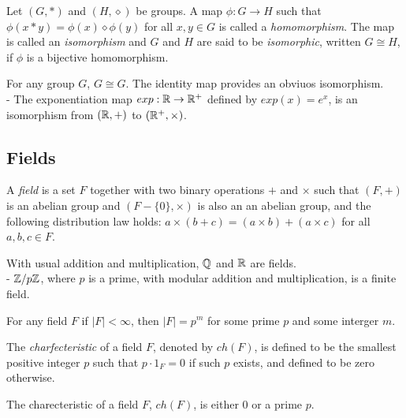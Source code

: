 \begin{definition}
  Let $(G,\ast)$ and $(H,\diamond)$ be groups. A map $\phi:G\rightarrow H$ such that
  $\phi(x\ast y)=\phi(x)\diamond\phi(y)$ for all $x,y\in G$ is called a \textit{homomorphism}.
  The map is called an \textit{isomorphism} and $G$ and $H$ are said to be \textit{isomorphic},
  written $G\cong H$, if $\phi$ is a bijective homomorphism. \cite{dummit}
\end{definition}

\begin{ex}
  For any group $G$, $G\cong G$. The identity map provides an obviuos isomorphism.\\
  - The exponentiation map $exp:\mathbb{R}\rightarrow \mathbb{R}^+$ defined by $exp(x)=e^x$, is an isomorphism
  from $(\mathbb{R},+)$ to $(\mathbb{R}^+,\times)$.
\end{ex}

\subsection{Fields}

\begin{definition}
  A \textit{field} is a set $F$ together with two binary operations $+$ and $\times$ such that
  $(F,+)$ is an abelian group and $(F-\{0\},\times)$ is also an an abelian group, and the
  following distribution law holds: $a\times(b+c)=(a\times b)+(a\times c)$ for all $a,b,c\in F$.
  \cite{dummit}
\end{definition}

\begin{ex}
  With usual addition and multiplication, $\mathbb{Q}$ and $\mathbb{R}$ are fields.\\
   - $\mathbb{Z}/p\mathbb{Z}$, where $p$ is a prime, with modular addition and multiplication, is a finite
  field.
\end{ex}

\begin{remark}
  For any field $F$ if $\vert F\vert <\infty$, then $\vert F\vert = p^m$ for some prime $p$
  and some interger $m$.
\end{remark}

\begin{definition}
  The \textit{charfecteristic} of a field $F$, denoted by $ch(F)$, is defined to be the smallest
  positive integer $p$ such that $p\cdot 1_F=0$ if such $p$ exists, and defined to be zero
  otherwise. \cite{dummit}
\end{definition}

\begin{remark}
  The charecteristic of a field $F$, $ch(F)$, is either $0$ or a prime $p$.
\end{remark}

